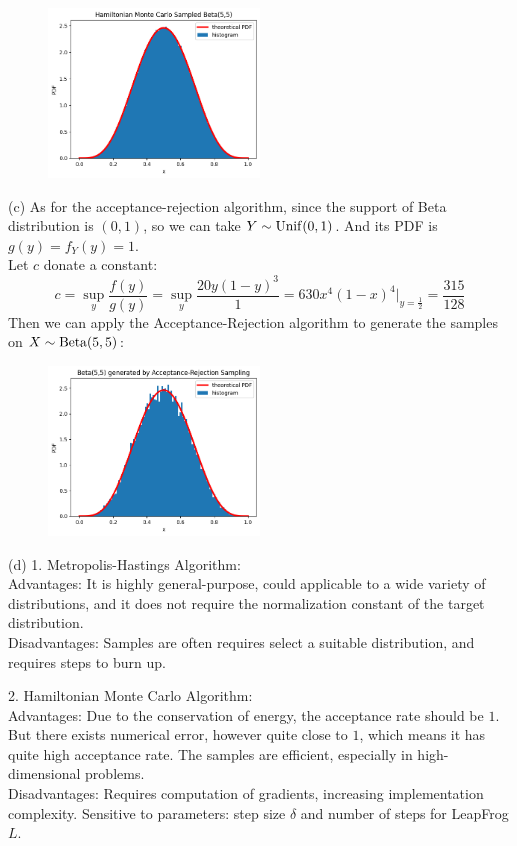 \begin{homeworkProblem}
\begin{figure}[h]
    \includegraphics[width=0.5\textwidth]{./figure/p5/Hamiltonian.png}
\end{figure}

(c) As for the acceptance-rejection algorithm, since the support of Beta distribution is $(0,1)$, so we can take $Y\sim \operatorname{Unif}(0,1)$. And its PDF is $g(y)=f_Y(y)=1$. \\
Let $c$ donate a constant:
$$c = \sup_y\dfrac{f(y)}{g(y)} = \sup_y\dfrac{20y(1-y)^3}{1}=630x^4(1-x)^4\big|_{y=\frac{1}{2}}=\dfrac{315}{128}$$
Then we can apply the Acceptance-Rejection algorithm to generate the samples on $X\sim \operatorname{Beta}(5,5)$:
\begin{figure}[h]
    \centering
    \includegraphics[width=0.5\textwidth]{./figure/p5/accept_reject.png}
\end{figure}

(d) 1. Metropolis-Hastings Algorithm: \\
Advantages: It is highly general-purpose, could applicable to a wide variety of distributions, and it does not require the normalization constant of the target distribution. \\
Disadvantages: Samples are often requires select a suitable distribution, and requires steps to burn up.

2. Hamiltonian Monte Carlo Algorithm: \\
Advantages: Due to the conservation of energy, the acceptance rate should be $1$. But there exists numerical error, however quite close to $1$, which means it has quite high acceptance rate. The samples are efficient, especially in high-dimensional problems. \\
Disadvantages: Requires computation of gradients, increasing implementation complexity. Sensitive to parameters: step size $\delta$ and number of steps for LeapFrog $L$.


\end{homeworkProblem}
